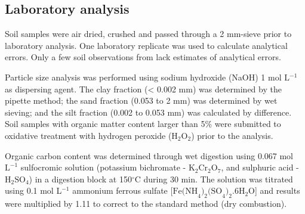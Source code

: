 
\tocless\subsection{Laboratory analysis}

Soil samples were air dried, crushed and passed through a 2 mm-sieve prior to laboratory analysis. One laboratory replicate was used to calculate analytical errors. Only a few soil observations from \citep{Pedron2005, MiguelEtAl2012} lack estimates of analytical errors.

Particle size analysis was performed using sodium hydroxide (NaOH) 1 mol $\text{L}{}^{-1}$ as dispersing agent. The clay fraction (< 0.002 mm) was determined by the pipette method; the sand fraction (0.053 to 2 mm) was determined by wet sieving; and the silt fraction (0.002 to 0.053 mm) was calculated by difference. Soil samples with organic matter content larger than 5\% were submitted to oxidative treatment with hydrogen peroxide ($\text{H}_{2}\text{O}_{2}$) prior to the analysis.

Organic carbon content was determined through wet digestion using 0.067 mol $\text{L}^{-1}$ sulfocromic solution (potassium bichromate - $\text{K}_{2}\text{Cr}_{2}\text{O}_{7}$, and sulphuric acid - $\text{H}_{2}\text{SO}_{4}$) in a digestion block at 150$^{\circ}$C during 30 min. The solution was titrated using 0.1 mol L$^{-1}$ ammonium ferrous sulfate {[}$\text{Fe(NH}_{4}\text{)}_{2}\text{(SO}_{4}\text{)}_{2}\text{.6H}_{2}\text{O}${]} and results were multiplied by 1.11 to correct to the standard method (dry combustion).%

